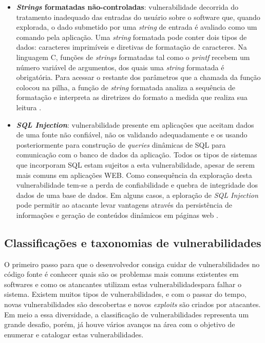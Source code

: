 \begin{itemize}
\item \textbf{\emph{Strings} formatadas não-controladas}: vulnerabilidade decorrida do tratamento inadequado das entradas do usuário sobre o software que, quando explorada, o dado submetido por uma \emph{string} de entrada é avaliado como um comando pela aplicação. Uma \emph{string} formatada pode conter dois tipos de dados: caracteres imprimíveis e diretivas de formatação de caracteres. Na linguagem C, funções de \emph{strings} formatadas tal como o \emph{printf} recebem um número variável de argumentos, dos quais uma \emph{string}  formatada é obrigatória. Para acessar o restante dos parâmetros que a chamada da função colocou na pilha, a função de \emph{string} formatada analiza a sequência de formatação e interpreta as diretrizes do formato a medida que realiza sua leitura \cite{lhee2002}.
\item \textbf{\emph{SQL Injection}}: vulnerabilidade presente em aplicações que aceitam dados de uma fonte não confiável, não os validando adequadamente e os usando posteriormente para construção de \emph{queries} dinâmicas de SQL para comunicação com o banco de dados da aplicação. Todos os tipos de sistemas que incorporam SQL estam sujeitos a esta vulnerabilidade, apesar de serem mais comuns em aplicações WEB. Como consequência da exploração desta vulnerabilidade tem-se a perda de confiabilidade e quebra de integridade dos dados de uma base de dados. Em alguns casos, a eploração de \emph{SQL Injection} pode permitir ao atacante levar vantagens através da persistência de informações e geração de conteúdos dinâmicos em páginas web \cite{uscert2012}.
\end{itemize}


\subsection{Classificações e taxonomias de vulnerabilidades}
\label{subsec-vulnerabilities-taxonomy}
%

O primeiro passo para que o desenvolvedor consiga cuidar de vulnerabilidades no código fonte é conhecer quais são os problemas mais comuns existentes em softwares e como os atancantes utilizam estas vulnerabilidadespara falhar o sistema. Existem muitos tipos de vulnerabilidades, e com o passar do tempo, novas vulnerabilidades são descobertas e novos \emph{exploits} são criados por atacantes. Em meio a essa diversidade, a classificação de vulnerabilidades representa um grande desafio, porém, já houve vários avanços na área com o objetivo de enumerar e catalogar estas vulnerabilidades.

